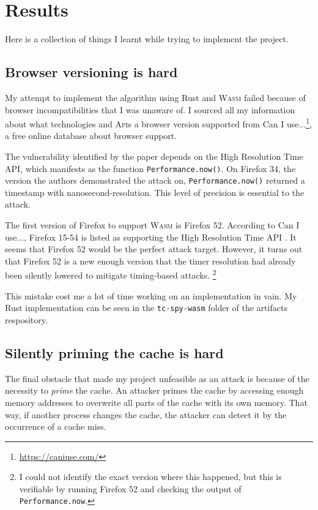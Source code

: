 \documentclass[a4paper,10pt,twocolumn]{article}
\theoremstyle{definition}
\newcommand*{\code}{\texttt}
\newcommand*{\acronym}{\textsc}
\newcommand*{\API}{\acronym{Api}}
\newcommand*{\WASM}{\acronym{Wasm}}
\begin{document}
\section{Results}

Here is a collection of things I learnt while trying to implement the project.

\subsection{Browser versioning is hard}

My attempt to implement the algorithm using Rust and \WASM{} failed because of
browser incompatibilities that I was unaware of.
I sourced all my information about what technologies and \API{}s a browser
version supported from Can I use...\footnote{\url{https://caniuse.com/}}, a free
online database about browser support.

The vulnerability identified by the paper depends on the High Resolution Time
API, which manifests as the function \code{Performance.now()}.
On Firefox 34, the version the authors demonstrated the attack on,
\code{Performance.now()} returned a timestamp with nanosecond-resolution.
This level of precision is essential to the attack.

The first version of Firefox to support \WASM{} is Firefox 52.
According to Can I use..., Firefox 15-54 is listed as supporting the High
Resolution Time API \parencite{caniuse}.
It seems that Firefox 52 would be the perfect attack target.
However, it turns out that Firefox 52 is a new enough version that the timer
resolution had already been silently lowered to mitigate timing-based attacks.
\footnote{I could not identify the exact version where this happened, but this
is verifiable by running Firefox 52 and checking the output of
\code{Performance.now}.}

This mistake cost me a lot of time working on an implementation in vain.
My Rust implementation can be seen in the \code{tc-spy-wasm} folder of the
artifacts respository.

\subsection{Silently priming the cache is hard}

The final obstacle that made my project unfeasible as an attack is because of
the necessity to \emph{prime} the cache.
An attacker primes the cache by accessing enough memory addresses to overwrite all parts
of the cache with its own memory.
That way, if another process changes the cache, the attacker can detect it by
the occurrence of a cache miss.
\end{document}
